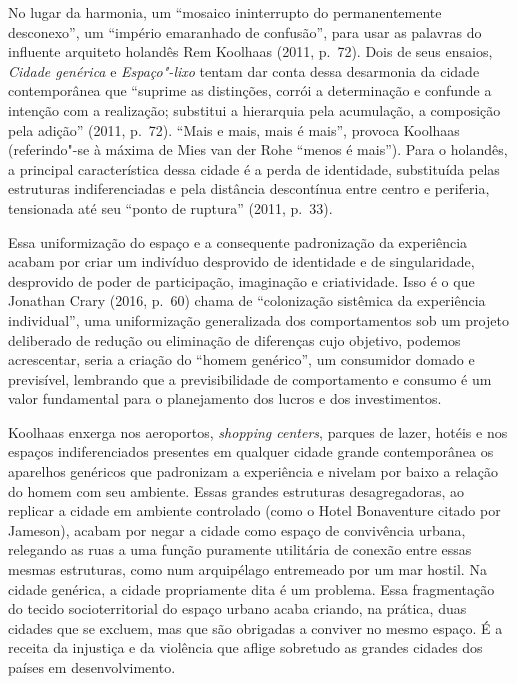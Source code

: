 No lugar da harmonia, um ``mosaico ininterrupto do permanentemente
desconexo'', um ``império emaranhado de confusão'', para usar as
palavras do influente arquiteto holandês Rem Koolhaas (2011, p.~72).
Dois de seus ensaios, \emph{Cidade genérica} e \emph{Espaço"-lixo} tentam
dar conta dessa desarmonia da cidade contemporânea que ``suprime as
distinções, corrói a determinação e confunde a intenção com a
realização; substitui a hierarquia pela acumulação, a composição pela
adição'' (2011, p.~72). ``Mais e mais, mais é mais'', provoca Koolhaas
(referindo"-se à máxima de Mies van der Rohe ``menos é mais''). Para o
holandês, a principal característica dessa cidade é a perda de
identidade, substituída pelas estruturas indiferenciadas e pela
distância descontínua entre centro e periferia, tensionada até seu
``ponto de ruptura'' (2011, p.~33).

Essa uniformização do espaço e a consequente padronização da experiência
acabam por criar um indivíduo desprovido de identidade e de
singularidade, desprovido de poder de participação, imaginação e
criatividade. Isso é o que Jonathan Crary (2016, p.~60) chama de
``colonização sistêmica da experiência individual'', uma uniformização
generalizada dos comportamentos sob um projeto deliberado de redução ou
eliminação de diferenças cujo objetivo, podemos acrescentar, seria a
criação do ``homem genérico'', um consumidor domado e previsível,
lembrando que a previsibilidade de comportamento e consumo é um valor
fundamental para o planejamento dos lucros e dos investimentos.

Koolhaas enxerga nos aeroportos, \emph{shopping centers}, parques de lazer,
hotéis e nos espaços indiferenciados presentes em qualquer cidade grande
contemporânea os aparelhos genéricos que padronizam a experiência e
nivelam por baixo a relação do homem com seu ambiente. Essas grandes
estruturas desagregadoras, ao replicar a cidade em ambiente controlado
(como o Hotel Bonaventure citado por Jameson), acabam por negar a cidade
como espaço de convivência urbana, relegando as ruas a uma função
puramente utilitária de conexão entre essas mesmas estruturas, como num
arquipélago entremeado por um mar hostil. Na cidade genérica, a cidade
propriamente dita é um problema. Essa fragmentação do tecido
socioterritorial do espaço urbano acaba criando, na prática, duas
cidades que se excluem, mas que são obrigadas a conviver no mesmo
espaço. É a receita da injustiça e da violência que aflige sobretudo as
grandes cidades dos países em desenvolvimento.

